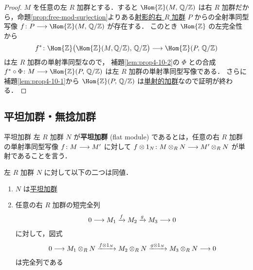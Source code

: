 \documentclass[algtopo_main]{subfiles}
\begin{document}
\begin{proof}
    $M$ を任意の左 $R$ 加群とする．すると $\Hom{\mathbb{Z}}(M,\, \mathbb{Q}/\mathbb{Z})$ は右 $R$ 加群だから，命題\ref{prop:free-mod-surjection}よりある\hyperref[def:proj-mod]{射影的右 $R$ 加群} $P$ からの全射準同型写像 $f \colon P \lto \Hom{\mathbb{Z}}(M,\, \mathbb{Q}/\mathbb{Z})$ が存在する．
    このとき $\Hom{\mathbb{Z}}$ の左完全性から 
    \begin{align}
        f^* \colon \Hom{\mathbb{Z}} \bigl( \Hom{\mathbb{Z}}(M, \mathbb{Q}/\mathbb{Z}),\, \mathbb{Q}/\mathbb{Z} \bigr) \lto \Hom{\mathbb{Z}} (P,\, \mathbb{Q}/\mathbb{Z})
    \end{align}
    は左 $R$ 加群の単射準同型なので，
    補題\ref{lem:prop4-10-2}の $\Phi$ との合成 $f^* \circ \Phi \colon M \lto \Hom{\mathbb{Z}}(P,\, \mathbb{Q}/\mathbb{Z})$ は左 $R$ 加群の単射準同型写像である．
    さらに補題\ref{lem:prop4-10-1}から $\Hom{\mathbb{Z}}(P,\, \mathbb{Q}/\mathbb{Z})$ は\hyperref[def:inj-mod]{単射的加群}なので証明が終わる．
\end{proof}


\subsection{平坦加群・無捻加群}

\begin{mydef}[label=def:flat-mod]{平坦加群}
    左 $R$ 加群 $N$ が\textbf{平坦加群} (flat module) であるとは，任意の右 $R$ 加群の単射準同型写像 $f\colon M \longrightarrow M'$ に対して $f \otimes 1_N \colon M \otimes_R N \longrightarrow M' \otimes_R N$ が単射であることを言う．
\end{mydef}

\begin{mylem}[label=lem:flat-mod-basic]{}
    左 $R$ 加群 $N$ に対して以下の二つは同値．
    \begin{enumerate}
        \item $N$ は\hyperref[def:flat-mod]{平坦加群}
        \item 任意の右 $R$ 加群の短完全列
        \begin{align}
            0 \longrightarrow M_1 \xrightarrow{f} M_2 \xrightarrow{g} M_3 \longrightarrow 0
        \end{align}
        に対して，図式
        \begin{align}
            0 \longrightarrow M_1 \otimes_R N \xrightarrow{f \otimes 1_N} M_2\otimes_R N \xrightarrow{g \otimes 1_N} M_3 \otimes_R N\longrightarrow 0
        \end{align}
        は完全列である
    \end{enumerate}
\end{mylem}
\end{document}
